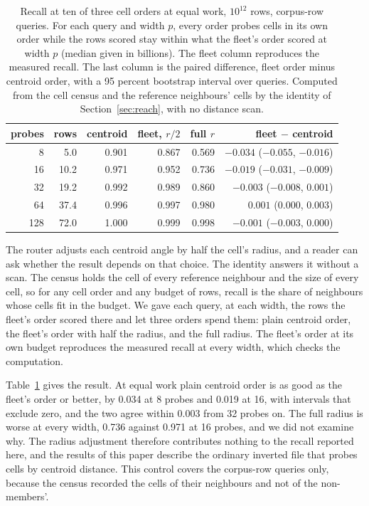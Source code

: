\documentclass[sigconf, nonacm]{acmart}
\begin{document}
\begin{table}[t]
\caption{Recall at ten of three cell orders at equal work, $10^{12}$ rows, corpus-row queries. For
each query and width $p$, every order probes cells in its own order while the rows scored stay
within what the fleet's order scored at width $p$ (median given in billions). The fleet column
reproduces the measured recall. The last column is the paired difference, fleet order minus
centroid order, with a 95 percent bootstrap interval over queries. Computed from the cell census
and the reference neighbours' cells by the identity of Section~\ref{sec:reach}, with no distance
scan.}
\label{tab:order}
\centering
\footnotesize
\setlength{\tabcolsep}{2.6pt}
\begin{tabular}{rrrrrr}
\toprule
probes & rows & centroid & fleet, $r/2$ & full $r$ & fleet $-$ centroid \\
\midrule
8   & 5.0   & 0.901 & 0.867 & 0.569 & $-0.034$ ($-0.055$, $-0.016$) \\
16  & 10.2  & 0.971 & 0.952 & 0.736 & $-0.019$ ($-0.031$, $-0.009$) \\
32  & 19.2  & 0.992 & 0.989 & 0.860 & $-0.003$ ($-0.008$, $0.001$) \\
64  & 37.4  & 0.996 & 0.997 & 0.980 & $0.001$ ($0.000$, $0.003$) \\
128 & 72.0  & 1.000 & 0.999 & 0.998 & $-0.001$ ($-0.003$, $0.000$) \\
\bottomrule
\end{tabular}
\end{table}

The router adjusts each centroid angle by half the cell's radius, and a reader can ask whether the
result depends on that choice. The identity answers it without a scan. The census holds the cell of
every reference neighbour and the size of every cell, so for any cell order and any budget of rows,
recall is the share of neighbours whose cells fit in the budget. We gave each query, at each width,
the rows the fleet's order scored there and let three orders spend them: plain centroid order, the
fleet's order with half the radius, and the full radius. The fleet's order at its own budget
reproduces the measured recall at every width, which checks the computation.

Table~\ref{tab:order} gives the result. At equal work plain centroid order is as good as the fleet's
order or better, by 0.034 at 8 probes and 0.019 at 16, with intervals that exclude zero, and the
two agree within 0.003 from 32 probes on. The full radius is worse at every width, 0.736 against
0.971 at 16 probes, and we did not examine why. The radius
adjustment therefore contributes nothing to the recall reported here, and the results of this paper
describe the ordinary inverted file that probes cells by centroid distance. This control covers the
corpus-row queries only, because the census recorded the cells of their neighbours and not of the
non-members'.
\end{document}
